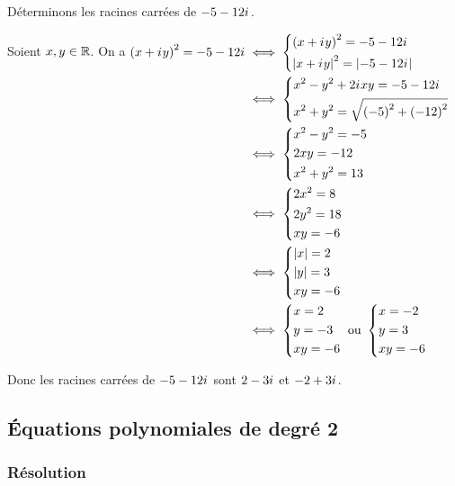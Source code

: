 \begin{ex}
Déterminons les racines carrées de \(-5-12i\mkern1mu\).

Soient \(x,y\in\mathbb{R}\). On a \(\begin{aligned}[t]
\left(x+i\mkern1mu y\right)^2=-5-12i\mkern1mu&\iff\begin{dcases}\left(x+i\mkern1mu y\right)^2=-5-12i\mkern1mu \\ \left\lvert x+i\mkern1mu y\right\rvert^2=\left\lvert-5-12i\mkern1mu\right\rvert\end{dcases} \\
&\iff\begin{dcases}x^2-y^2+2i\mkern1mu xy=-5-12i\mkern1mu \\ x^2+y^2=\sqrt{\left(-5\right)^2+\left(-12\right)^2}\end{dcases} \\
&\iff\begin{dcases}x^2-y^2=-5 \\ 2xy=-12 \\ x^2+y^2=13\end{dcases} \\
&\iff\begin{dcases}2x^2=8 \\ 2y^2=18 \\ xy=-6\end{dcases} \\
&\iff\begin{dcases}\left\lvert x\right\rvert=2 \\ \left\lvert y\right\rvert=3 \\ xy=-6\end{dcases} \\
&\iff\begin{dcases}x=2 \\ y=-3 \\ xy=-6\end{dcases}\text{ ou }\begin{dcases}x=-2 \\ y=3 \\ xy=-6\end{dcases}
\end{aligned}\)

Donc les racines carrées de \(-5-12i\mkern1mu\) sont \(2-3i\mkern1mu\) et \(-2+3i\mkern1mu\).
\end{ex}

\subsection{Équations polynomiales de degré 2}

\subsubsection{Résolution}

